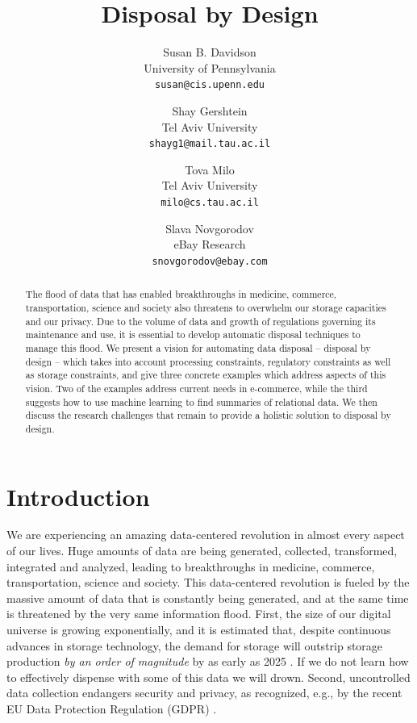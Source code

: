 \documentclass[11pt,dvipdfm]{article}
\begin{document}
\title{Disposal by Design}
\author{
  Susan B. Davidson\\
  \small{University of Pennsylvania}\\
  \texttt{\small{susan@cis.upenn.edu}}
  \and
  Shay Gershtein\\
  \small{Tel Aviv University}\\
  \texttt{\small{shayg1@mail.tau.ac.il}}
  \and
  Tova Milo\\
  \small{Tel Aviv University}\\
  \texttt{\small{milo@cs.tau.ac.il}}
  \and
  Slava Novgorodov\\
  \small{eBay Research}\\
  \texttt{\small{snovgorodov@ebay.com}}  
}


\maketitle

\begin{abstract}
The flood of data that has enabled breakthroughs in medicine, commerce, transportation, science and society also threatens to overwhelm our storage capacities and our privacy.  Due to the volume of data and growth of regulations governing its maintenance and use, it is essential to develop automatic disposal techniques to manage this flood.
We present a vision for automating data disposal -- disposal by design -- which takes into account processing constraints, regulatory constraints as well as storage
constraints, and give three concrete examples which address aspects of this vision.  Two of the examples address current needs in e-commerce, while the third suggests how to use machine learning to find summaries of relational data. We then discuss the research challenges that remain to provide a holistic solution to disposal by design.
\end{abstract}




\section{Introduction}
\label{sec: intro}
We are experiencing an amazing data-centered
revolution in almost every aspect of our lives. Huge amounts of
data are being generated, collected, transformed, integrated and
analyzed, leading to breakthroughs in medicine, commerce,
transportation, science and society. This data-centered revolution
is fueled by the massive amount of data that is constantly being generated, and at the same time is threatened by the very same information flood. First, the size of our digital universe is growing exponentially, and it is estimated that, despite continuous advances in storage technology, the demand for storage will outstrip storage production {\em by an order of magnitude} by as early as 2025 \cite{dataage}.
If we do not learn how to effectively dispense with some of this data we will drown. 
Second, uncontrolled data collection endangers security and privacy, as recognized, e.g., by the recent EU Data Protection Regulation (GDPR) \cite{gdpr}. 
\end{document}
